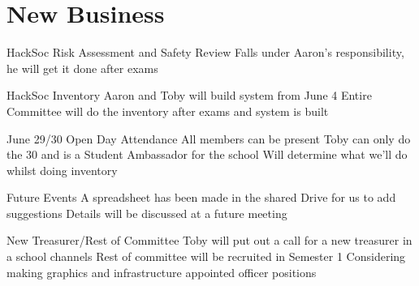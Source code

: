 \documentclass[11pt,hacksoc]{meetingmins}
\begin{document}
\section{New Business}
\begin{items}
\item
HackSoc Risk Assessment and Safety Review
\subitem
Falls under Aaron's responsibility, he will get it done after exams

\item
HackSoc Inventory
\subitem
Aaron and Toby will build system from June 4
\subitem
Entire Committee will do the inventory after exams and system is built


\item
June 29/30 Open Day Attendance
\subitem
All members can be present
\subsubitem
Toby can only do the 30 and is a Student Ambassador for the school
\subitem
Will determine what we'll do whilst doing inventory
\item
Future Events
\subitem
A spreadsheet has been made in the shared Drive for us to add suggestions
\subitem
Details will be discussed at a future meeting

\item
New Treasurer/Rest of Committee
\subitem
Toby will put out a call for a new treasurer in a school channels
\subitem
Rest of committee will be recruited in Semester 1
\subitem
Considering making graphics and infrastructure appointed officer positions



\end{items}

\vspace{1em}
\end{document}
